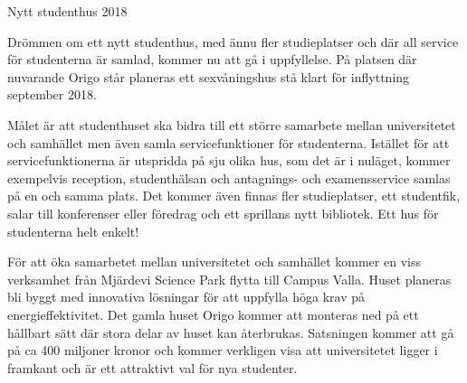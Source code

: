Nytt studenthus 2018

Drömmen om ett nytt studenthus, med ännu fler studieplatser och där
all service för studenterna är samlad, kommer nu att gå i
uppfyllelse. På platsen där nuvarande Origo står planeras ett
sexvåningshus stå klart för inflyttning september 2018.

Målet är att studenthuset ska bidra till ett större samarbete mellan
universitetet och samhället men även samla servicefunktioner för
studenterna. Istället för att servicefunktionerna är utspridda på sju
olika hus, som det är i nuläget, kommer exempelvis reception,
studenthälsan och antagnings- och examensservice samlas på en och
samma plats. Det kommer även finnas fler studieplatser, ett
studentfik, salar till konferenser eller föredrag och ett sprillans
nytt bibliotek. Ett hus för studenterna helt enkelt!

För att öka samarbetet mellan universitetet och samhället kommer en
viss verksamhet från Mjärdevi Science Park flytta till Campus
Valla. Huset planeras bli byggt med innovativa lösningar för att
uppfylla höga krav på energieffektivitet. Det gamla huset Origo kommer
att monteras ned på ett hållbart sätt där stora delar av huset kan
återbrukas. Satsningen kommer att gå på ca 400 miljoner kronor och
kommer verkligen visa att universitetet ligger i framkant och är ett
attraktivt val för nya studenter.

